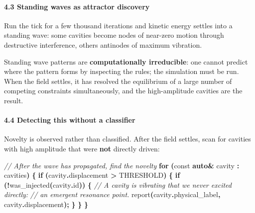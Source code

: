 \documentclass[
  11pt,
  a4paper,
]{article}
\newenvironment{Shaded}{\begin{snugshade}}{\end{snugshade}}
\newcommand{\AttributeTok}[1]{\textcolor[rgb]{0.13,0.29,0.53}{#1}}
\newcommand{\CommentTok}[1]{\textcolor[rgb]{0.56,0.35,0.01}{\textit{#1}}}
\newcommand{\ControlFlowTok}[1]{\textcolor[rgb]{0.13,0.29,0.53}{\textbf{#1}}}
\newcommand{\KeywordTok}[1]{\textcolor[rgb]{0.13,0.29,0.53}{\textbf{#1}}}
\newcommand{\NormalTok}[1]{#1}
\newcommand{\OperatorTok}[1]{\textcolor[rgb]{0.81,0.36,0.00}{\textbf{#1}}}
\begin{document}
\paragraph{4.3 Standing waves as attractor
discovery}\label{standing-waves-as-attractor-discovery}

Run the tick for a few thousand iterations and kinetic energy settles
into a standing wave: some cavities become nodes of near-zero motion
through destructive interference, others antinodes of maximum vibration.

Standing wave patterns are \textbf{computationally irreducible}: one
cannot predict where the pattern forms by inspecting the rules; the
simulation must be run. When the field settles, it has resolved the
equilibrium of a large number of competing constraints simultaneously,
and the high-amplitude cavities are the result.

\paragraph{4.4 Detecting this without a
classifier}\label{detecting-this-without-a-classifier}

Novelty is observed rather than classified. After the field settles,
scan for cavities with high amplitude that were \textbf{not} directly
driven:

\begin{Shaded}
\begin{Highlighting}[]
\CommentTok{// After the wave has propagated, find the novelty}
\ControlFlowTok{for} \OperatorTok{(}\AttributeTok{const} \KeywordTok{auto}\OperatorTok{\&}\NormalTok{ cavity }\OperatorTok{:}\NormalTok{ cavities}\OperatorTok{)} \OperatorTok{\{}
    \ControlFlowTok{if} \OperatorTok{(}\NormalTok{cavity}\OperatorTok{.}\NormalTok{displacement }\OperatorTok{\textgreater{}}\NormalTok{ THRESHOLD}\OperatorTok{)} \OperatorTok{\{}
        \ControlFlowTok{if} \OperatorTok{(!}\NormalTok{was\_injected}\OperatorTok{(}\NormalTok{cavity}\OperatorTok{.}\NormalTok{id}\OperatorTok{))} \OperatorTok{\{}
            \CommentTok{// A cavity is vibrating that we never excited directly:}
            \CommentTok{// an emergent resonance point.}
\NormalTok{            report}\OperatorTok{(}\NormalTok{cavity}\OperatorTok{.}\NormalTok{physical\_label}\OperatorTok{,}\NormalTok{ cavity}\OperatorTok{.}\NormalTok{displacement}\OperatorTok{);}
        \OperatorTok{\}}
    \OperatorTok{\}}
\OperatorTok{\}}
\end{Highlighting}
\end{Shaded}
\end{document}
